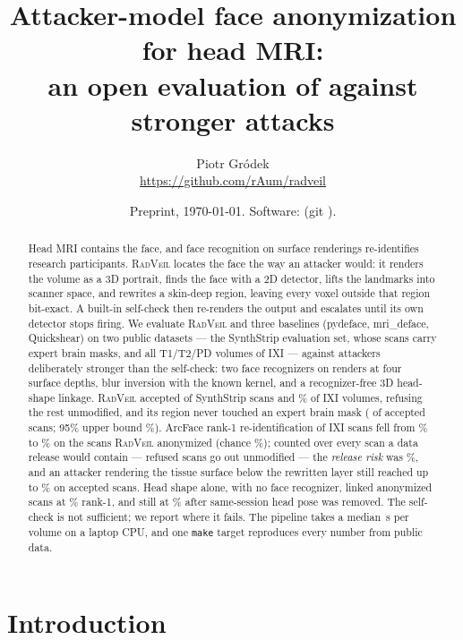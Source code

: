 \documentclass[11pt]{article}
\title{Attacker-model face anonymization for head MRI:\\
an open evaluation of \rv{} against stronger attacks}
\author{Piotr Gr\'odek\\\small\url{https://github.com/rAum/radveil}}
\date{\small Preprint, \today. Software: \swVersion{} (git \code{\swGit}).}
\newcommand{\rv}{\textsc{RadVeil}}
\newcommand{\code}[1]{\texttt{#1}}
\begin{document}
\maketitle

\begin{abstract}
Head MRI contains the face, and face recognition on surface renderings
re-identifies research participants. \rv{} locates the face the way an
attacker would: it renders the volume as a 3D portrait, finds the face with
a 2D detector, lifts the landmarks into scanner space, and rewrites a
skin-deep region, leaving every voxel outside that region bit-exact. A
built-in self-check then re-renders the output and escalates until its own
detector stops firing. We evaluate \rv{} and three baselines (pydeface,
mri\_deface, Quickshear) on two public datasets --- the SynthStrip
evaluation set, whose \ssWithImage{} scans carry expert brain masks, and all
T1/T2/PD volumes of IXI --- against attackers deliberately stronger than the
self-check: two face recognizers on renders at four surface depths, blur
inversion with the known kernel, and a recognizer-free 3D head-shape
linkage. \rv{} accepted \ssAccepted{} of \ssCases{} SynthStrip scans and
\ixiAcceptedPct\% of IXI volumes, refusing the rest unmodified, and its
region never touched an expert brain mask (\bsAdaptiveTouched{} of
\bsAdaptiveN{} accepted scans; 95\% upper bound \bsAdaptiveAllUpper\%).
ArcFace rank-1 re-identification of IXI scans fell from
\reidArcFaceControlRankFused\% to \reidArcFaceAdaptiveAccRank\% on the scans
\rv{} anonymized (chance \reidArcFaceChance\%); counted over every scan a
data release would contain --- refused scans go out unmodified --- the
\emph{release risk} was \reidArcFaceAdaptiveRisk\%, and an attacker
rendering the tissue surface below the rewritten layer still reached up to
\reidArcFaceAdaptiveAccDepthFour\% on accepted scans. Head shape alone, with
no face recognizer, linked anonymized scans at \shapeAdaptiveWholeRank\%
rank-1, and still at \shapeAdaptivePoseRank\% after same-session head pose
was removed. The self-check is not sufficient; we report where it fails. The
pipeline takes a median \profCohortMedianS\,s per volume on a laptop CPU,
and one \code{make} target reproduces every number from public data.
\end{abstract}

\section{Introduction}
\end{document}
